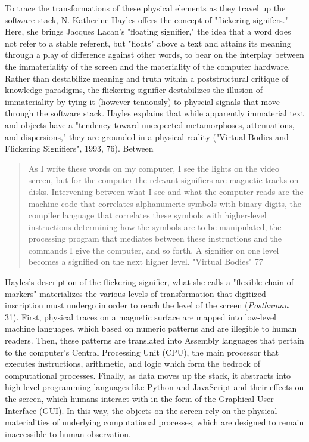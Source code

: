\documentclass[11pt]{article}
\begin{document}
To trace the transformations of these physical elements as they travel
up the software stack, N. Katherine Hayles offers the concept of
"flickering signifers." Here, she brings Jacques Lacan's "floating
signifier," the idea that a word does not refer to a stable referent,
but "floats" above a text and attains its meaning through a play of
difference against other words, to bear on the interplay between the
immateriality of the screen and the materiality of the computer
hardware. Rather than destabilize meaning and truth within a
poststructural critique of knowledge paradigms, the flickering
signifier destabilizes the illusion of immateriality by tying it
(however tenuously) to physcial signals that move through the software
stack. Hayles explains that while apparently immaterial text and
objects have a "tendency toward unexpected metamorphoses,
attenuations, and dispersions," they are grounded in a physical
reality ("Virtual Bodies and Flickering Signifiers", 1993,
76). Between 
\begin{quote}
As I write these words on my computer, I see the lights on the video
screen, but for the computer the relevant signifiers are magnetic
tracks on disks. Intervening between what I see and what the computer
reads are the machine code that correlates alphanumeric symbols with
binary digits, the compiler language that correlates these symbols
with higher-level instructions determining how the symbols are to be
manipulated, the processing program that mediates between these
instructions and the commands I give the computer, and so forth. A
signifier on one level becomes a signified on the next higher
level. "Virtual Bodies" 77
\end{quote}
Hayles's description of the flickering signifier, what she calls a
"flexible chain of markers" materializes the various levels of
transformation that digitized inscription must undergo in order to
reach the level of the screen (\emph{Posthuman} 31). First, physical traces
on a magnetic surface are mapped into low-level machine languages,
which based on numeric patterns and are illegible to human
readers. Then, these patterns are translated into Assembly languages
that pertain to the computer's Central Processing Unit (CPU), the main
processor that executes instructions, arithmetic, and logic which form
the bedrock of computational processes. Finally, as data moves up the
stack, it abstracts into high level programming languages like Python
and JavaScript and their effects on the screen, which humans interact
with in the form of the Graphical User Interface (GUI). In this way,
the objects on the screen rely on the physical materialities of
underlying computational processes, which are designed to remain
inaccessible to human observation.
\end{document}
